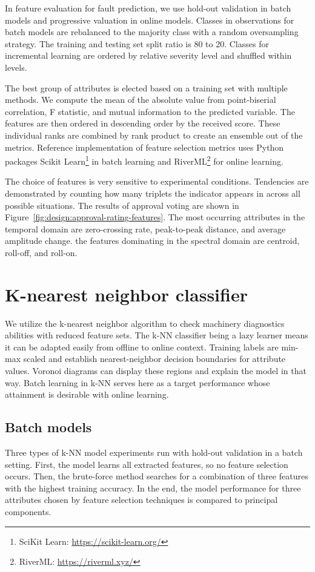 In feature evaluation for fault prediction, we use hold-out validation in batch models and progressive valuation in online models. Classes in observations for batch models are rebalanced to the majority class with a random oversampling strategy. The training and testing set split ratio is 80 to 20. Classes for incremental learning are ordered by relative severity level and shuffled within levels. 

The best group of attributes is elected based on a training set with multiple methods. We compute the mean of the absolute value from point-biserial correlation, F statistic, and mutual information to the predicted variable. The features are then ordered in descending order by the received score. These individual ranks are combined by rank product to create an ensemble out of the metrics. Reference implementation of feature selection metrics uses Python packages Scikit Learn\footnote{SciKit Learn: \url{https://scikit-learn.org/}} in batch learning and RiverML\footnote{RiverML: \url{https://riverml.xyz/}} for online learning.


The choice of features is very sensitive to experimental conditions. Tendencies are demonstrated by counting how many triplets the indicator appears in across all possible situations. The results of approval voting are shown in Figure~\ref{fig:design:approval-rating-features}. The most occurring attributes in the temporal domain are zero-crossing rate, peak-to-peak distance, and average amplitude change. the features dominating in the spectral domain are centroid, roll-off, and roll-on.


\section{K-nearest neighbor classifier}
We utilize the k-nearest neighbor algorithm to check machinery diagnostics abilities with reduced feature sets. The k-NN classifier being a lazy learner means it can be adapted easily from offline to online context. Training labels are min-max scaled and establish nearest-neighbor decision boundaries for attribute values. Voronoi diagrams can display these regions and explain the model in that way. Batch learning in k-NN serves here as a target performance whose attainment is desirable with online learning.

\subsection{Batch models}
Three types of k-NN model experiments run with hold-out validation in a batch setting. First, the model learns all extracted features, so no feature selection occurs. Then, the brute-force method searches for a combination of three features with the highest training accuracy. In the end, the model performance for three attributes chosen by feature selection techniques is compared to principal components.


